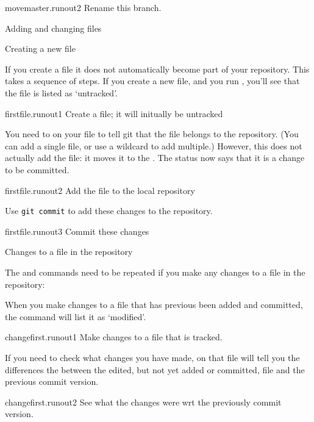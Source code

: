 \begin{gitstep}{movemaster.runout2}
  Rename this branch.
\end{gitstep}

 {Adding and changing files}
\label{sec:hg-push}

 {Creating a new file}

If you create a file it does not automatically become part of your repository.
This takes a sequence of steps.
If you create a new file, and you run ,
you'll see that the file is listed as `untracked'.

\begin{gitstep}{firstfile.runout1}
  Create a file; it will initually be untracked
\end{gitstep}

You need to  on your file to tell git that the file
belongs to the repository.
(You can add a single file, or use a wildcard to add multiple.)
However, this does not actually add the file:
it moves it to the .
The status now says that it is a change to be committed.

\begin{gitstep}{firstfile.runout2}
  Add the file to the local repository
\end{gitstep}

Use \lstinline{git commit} to add these changes to the repository.

\begin{gitstep}{firstfile.runout3}
  Commit these changes
\end{gitstep}

 {Changes to a file in the repository}

The  and  commands need to be repeated
if you make any changes to a file in the repository:

When you make changes to a file that has previous been added and committed,
the  command will list it as `modified'.

\begin{gitstep}{changefirst.runout1}
  Make changes to a file that is tracked.
\end{gitstep}

If you need to check what changes you have made,  on that file
will tell you the differences the between the edited, but not yet added or committed,
file and the previous commit version.

\begin{gitstep}{changefirst.runout2}
  See what the changes were wrt the previously commit version.
\end{gitstep}

